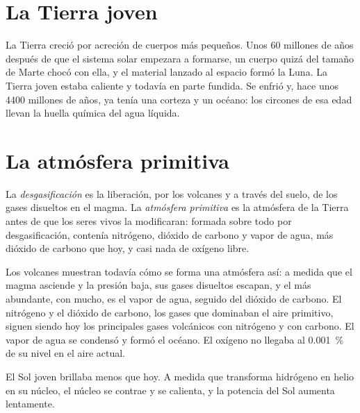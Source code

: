 \section{La Tierra joven}

La Tierra creció por acreción de cuerpos más pequeños. Unos 60 millones de
años después de que el sistema solar empezara a formarse, un cuerpo quizá del
tamaño de Marte chocó con ella, y el material lanzado al espacio formó la
Luna. La Tierra joven estaba caliente y todavía en parte fundida. Se enfrió y,
hace unos 4400 millones de años, ya tenía una corteza y un océano: los
circones de esa edad llevan la huella química del agua líquida.

\section{La atmósfera primitiva}

\begin{definition}\label{def:g12:early-earth:primitive-atmosphere}
La \emph{desgasificación} es la
liberación, por los volcanes y a través del suelo, de los gases disueltos en
el magma. La \emph{atmósfera primitiva}
es la atmósfera de la Tierra antes de que los seres vivos la modificaran:
formada sobre todo por desgasificación, contenía nitrógeno, dióxido de carbono
y vapor de agua, más dióxido de carbono que hoy, y casi nada de oxígeno libre.
\end{definition}

Los volcanes muestran todavía cómo se forma una atmósfera así: a medida que el
magma asciende y la presión baja, sus gases disueltos escapan, y el más
abundante, con mucho, es el vapor de agua, seguido del dióxido de carbono. El
nitrógeno y el dióxido de carbono, los gases que dominaban el aire primitivo,
siguen siendo hoy los principales gases volcánicos con nitrógeno y con
carbono. El vapor de agua se condensó y formó el océano. El oxígeno no llegaba
al \qty{0.001}{\percent} de su nivel en el aire actual.

El Sol joven brillaba menos que hoy. A medida que transforma hidrógeno en
helio en su núcleo, el núcleo se contrae y se calienta, y la potencia del Sol
aumenta lentamente.

